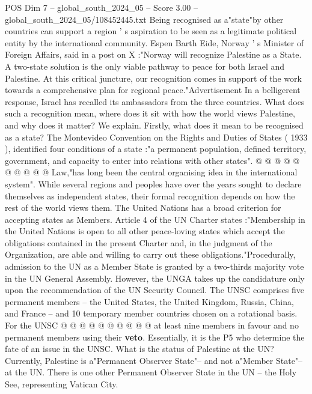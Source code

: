 \begin{textsample}{POS Dim 7 – global\_south\_2024\_05 – Score 3.00 – global\_south\_2024\_05/108452445.txt}  \label{ex:f7_pos_065}
Being recognised as a"state"by other countries can support a region ' s aspiration to be seen as a legitimate political entity by the international community.
Espen Barth Eide, Norway ' s Minister of Foreign Affairs, said in a post on X :"Norway will recognize Palestine as a State.
A two-state solution is the only viable pathway to peace for both Israel and Palestine.
At this critical juncture, our recognition comes in support of the work towards a comprehensive plan for regional peace."Advertisement In a belligerent response, Israel has recalled its ambassadors from the three countries.
What does such a recognition mean, where does it sit with how the world views Palestine, and why does it matter?
We explain.
Firstly, what does it mean to be recognised as a state?
The Montevideo Convention on the Rights and Duties of States ( 1933 ), identified four conditions of a state :"a permanent population, defined territory, government, and capacity to enter into relations with other states". @ @ @ @ @ @ @ @ @ @ Law,"has long been the central organising idea in the international system".
While several regions and peoples have over the years sought to declare themselves as independent states, their formal recognition depends on how the rest of the world views them.
The United Nations has a broad criterion for accepting states as Members.
Article 4 of the UN Charter states :"Membership in the United Nations is open to all other peace-loving states which accept the obligations contained in the present Charter and, in the judgment of the Organization, are able and willing to carry out these obligations."Procedurally, admission to the UN as a Member State is granted by a two-thirds majority vote in the UN General Assembly.
However, the UNGA takes up the candidature only upon the recommendation of the UN Security Council.
The UNSC comprises five permanent members -- the United States, the United Kingdom, Russia, China, and France -- and 10 temporary member countries chosen on a rotational basis.
For the UNSC @ @ @ @ @ @ @ @ @ @ at least nine members in favour and no permanent members using their \textbf{veto}.
Essentially, it is the P5 who determine the fate of an issue in the UNSC.
What is the status of Palestine at the UN?
Currently, Palestine is a"Permanent Observer State"-- and not a"Member State"-- at the UN.
There is one other Permanent Observer State in the UN -- the Holy See, representing Vatican City.

\end{textsample}
